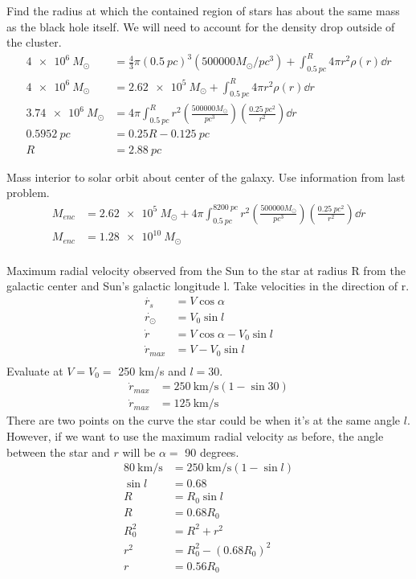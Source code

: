 \documentclass{homework}
\begin{document}
\question
Find the radius at which the contained region of stars has about the same mass as the black hole itself. We will need to account for the density drop outside of the cluster.
\begin{align*}
    \SI{4e6}{} M_\odot	&= \frac{4}{3}\pi (\SI{0.5}{pc})^3 (500000 M_\odot \si{\per pc^3}) + \int_{\SI{0.5}{pc}}^R 4\pi r^2 \rho(r) \dd{r}	\\
    \SI{4e6}{} M_\odot	&= \SI{2.62e5}{} M_\odot + \int_{\SI{0.5}{pc}}^R 4\pi r^2 \rho(r) \dd{r}	\\
    \SI{3.74e6}{} M_\odot	&=  4\pi \int_{\SI{0.5}{pc}}^R r^2 (\frac{500000 M_\odot}{\si{pc^3}})(\frac{\SI{0.25}{pc^2}}{r^2}) \dd{r}	\\
    \SI{0.5952}{pc}	&=  0.25R - \SI{0.125}{pc} \\
    R   &=  \boxed{\SI{2.88}{pc}}
\end{align*}


\question
Mass interior to solar orbit about center of the galaxy. Use information from last problem.
\begin{align*}
    M_{enc}	&=  \SI{2.62e5}{} M_\odot + 4\pi \int_{\SI{0.5}{pc}}^{\SI{8200}{pc}} r^2 (\frac{500000 M_\odot}{\si{pc^3}})(\frac{\SI{0.25}{pc^2}}{r^2}) \dd{r}	\\
    M_{enc}    &=	\boxed{\SI{1.28e10}{} M_\odot}  \\
\end{align*}


\question
Maximum radial velocity observed from the Sun to the star at radius R from the galactic center and Sun's galactic longitude l. Take velocities in the direction of r.
\begin{align*}
    \dot{r_s} &= V \cos{\alpha} \\
    \dot{r_\odot}    &=	V_0 \sin{l}	\\
    \dot{r} &=  V \cos{\alpha} - V_0 \sin{l}    \\
    \dot{r}_{max}   &=  \boxed{V - V_0\sin{l}}  \\
\end{align*}
Evaluate at $V = V_0 = $ 250 km/s and $l = 30$.
\begin{align*}
    \dot{r}_{max}   &=  \SI{250}{\kilo\metre/\second}(1 - \sin{30})  \\
    \dot{r}_{max}   &=  \boxed{\SI{125}{\kilo\metre/\second}}
\end{align*}
There are two points on the curve the star could be when it's at the same angle $l$. However, if we want to use the maximum radial velocity as before, the angle between the star and $r$ will be $\alpha =$ 90 degrees.
\begin{align*}
    \SI{80}{\kilo\metre/\second}   &=  \SI{250}{\kilo\metre/\second}(1 - \sin{l})	\\
    \sin{l} &=  0.68    \\
    R   &=  R_0 \sin{l} \\
    R   &=  0.68 R_0 \\
    R_0^2   &=  R^2 + r^2   \\
    r^2 &=  R_0^2 - (0.68 R_0)^2    \\
    r   &=  \boxed{0.56R_0}
\end{align*}
\end{document}
